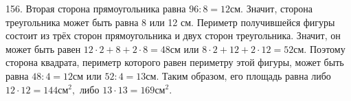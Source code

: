 156. Вторая сторона прямоугольника равна $96:8=12$см. Значит, сторона треугольника может быть равна 8 или 12 см. Периметр получившейся фигуры состоит из трёх сторон прямоугольника и двух сторон треугольника. Значит, он может быть равен $12\cdot2+8+2\cdot8=48$см или $8\cdot2+12+2\cdot12=52$см. Поэтому сторона квадрата, периметр которого равен периметру этой фигуры, может быть равна $48:4=12$см или $52:4=13$см. Таким образом, его площадь равна либо $12\cdot12=144\text{см}^2,$ либо $13\cdot13=169\text{см}^2.$\\
